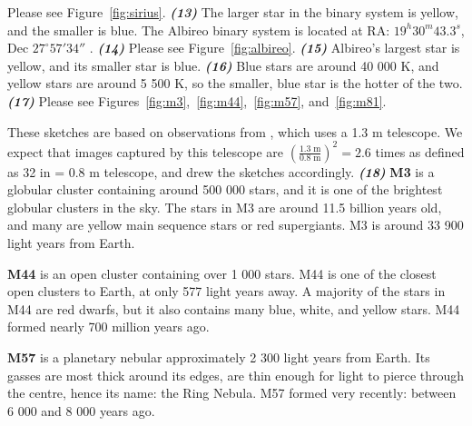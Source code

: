 \documentclass[11pt]{article}
\begin{document}
Please see Figure~\ref{fig:sirius}.
\newline
\newline
\noindent
\textbf{\emph{(13)}}
The larger star in the binary system is yellow, and the smaller is blue.
The Albireo binary system is located at RA: $19^h 30^m 43.3^s$, Dec $27^\circ 57' 34''$ \cite{albireo}.
\newline
\newline
\noindent
\textbf{\emph{(14)}}
Please see Figure~\ref{fig:albireo}.
\newline
\newline
\noindent
\textbf{\emph{(15)}}
Albireo's largest star is yellow, and its smaller star is blue.
\newline
\newline
\noindent
\textbf{\emph{(16)}}
Blue stars are around 40 000 K, and yellow stars are around 5 500 K, so the smaller, blue star is the hotter of the two.
\newline
\newline
\noindent
\textbf{\emph{(17)}}
Please see Figures~\ref{fig:m3},~\ref{fig:m44},~\ref{fig:m57}, and~\ref{fig:m81}.

These sketches are based on observations from \cite{2mass}, which uses a 1.3 m telescope.
We expect that images captured by this telescope are $\left(\frac{1.3\;\textrm{m}}{0.8\;\textrm{m}}\right)^2 = 2.6$ times as defined as 32 in = 0.8 m telescope, and drew the sketches accordingly.
\newline
\newline
\noindent
\textbf{\emph{(18)}}
\textbf{M3} is a globular cluster containing around 500 000 stars, and it is one of the brightest globular clusters in the sky.
The stars in M3 are around 11.5 billion years old, and many are yellow main sequence stars or red supergiants.
M3 is around 33 900 light years from Earth.
\cite{messier3}

\textbf{M44} is an open cluster containing over 1 000 stars.
M44 is one of the closest open clusters to Earth, at only 577 light years away.
A majority of the stars in M44 are red dwarfs, but it also contains many blue, white, and yellow stars.
M44 formed nearly 700 million years ago.
\cite{messier44}

\textbf{M57} is a planetary nebular approximately 2 300 light years from Earth.
Its gasses are most thick around its edges, are thin enough for light to pierce through the centre, hence its name: the Ring Nebula.
M57 formed very recently: between 6 000 and 8 000 years ago.
\cite{messier57}
\end{document}
